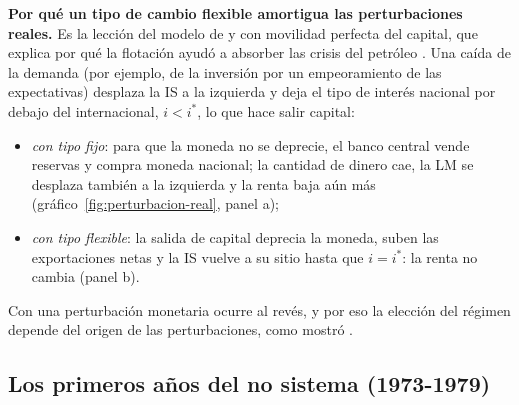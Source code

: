 \documentclass[11pt]{article}
\begin{document}
\begin{anotaciones}
\textbf{Por qué un tipo de cambio flexible amortigua las perturbaciones reales.} Es la lección del modelo de  y  con movilidad perfecta del capital, que explica por qué la flotación ayudó a absorber las crisis del petróleo  . Una caída de la demanda (por ejemplo, de la inversión por un empeoramiento de las expectativas) desplaza la IS a la izquierda y deja el tipo de interés nacional por debajo del internacional, $i<i^*$, lo que hace salir capital:
\begin{itemize}
\item \emph{con tipo fijo}: para que la moneda no se deprecie, el banco central vende reservas y compra moneda nacional; la cantidad de dinero cae, la LM se desplaza también a la izquierda y la renta baja aún más (gráfico~\ref{fig:perturbacion-real}, panel a);
\item \emph{con tipo flexible}: la salida de capital deprecia la moneda, suben las exportaciones netas y la IS vuelve a su sitio hasta que $i=i^*$: la renta no cambia (panel b).
\end{itemize}
Con una perturbación monetaria ocurre al revés, y por eso la elección del régimen depende del origen de las perturbaciones, como mostró  .
\begin{figuracaja}
\caption{Una perturbación real negativa con tipo de cambio fijo y flexible (modelo de Mundell y Fleming)}\label{fig:perturbacion-real}
\end{figuracaja}
\end{anotaciones}

\subsection{Los primeros años del no sistema (1973-1979)}\label{sec:primeros}
\end{document}
